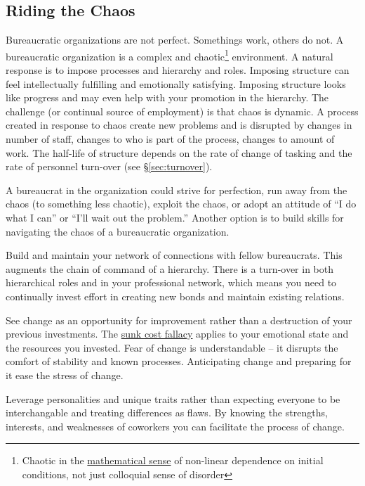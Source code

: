 \subsection{Riding the Chaos}

Bureaucratic organizations are not perfect. Somethings work, others do not. A bureaucratic organization is a complex and chaotic\footnote{Chaotic in the \href{https://en.wikipedia.org/wiki/Chaos_theory}{mathematical sense} of non-linear dependence on initial conditions, not just colloquial sense of disorder} environment. A natural response is to impose processes and hierarchy and roles. Imposing structure can feel intellectually fulfilling and emotionally satisfying. Imposing structure looks like progress and may even help with your promotion in the hierarchy. The challenge (or continual source of employment) is that chaos is dynamic. A process created in response to chaos create new problems and is disrupted by changes in number of staff, changes to who is part of the process, changes to amount of work. The half-life of structure depends on the rate of change of tasking and the rate of personnel turn-over (see \S\ref{sec:turnover}).

A bureaucrat in the organization could strive for perfection, run away from the chaos (to something less chaotic), exploit the chaos, or adopt an attitude of ``I do what I can'' or ``I'll wait out the problem.'' 
Another option is to build skills for navigating the chaos of a bureaucratic organization.

Build and maintain your network of connections with fellow bureaucrats. This augments the chain of command of a hierarchy. There is a turn-over in both hierarchical roles and in your professional network, which means you need to continually invest effort in creating new bonds and maintain existing relations. 

See change as an opportunity for improvement rather than a destruction of your previous investments. The \href{https://en.wikipedia.org/wiki/Sunk_cost}{sunk cost fallacy} applies to your emotional state and the resources you invested. Fear of change is understandable -- it disrupts the comfort of stability and known processes. Anticipating change and preparing for it ease the stress of change.

Leverage personalities and unique traits rather than expecting everyone to be interchangable and treating differences as flaws. 
By knowing the strengths, interests, and weaknesses of coworkers you can facilitate the process of change. 